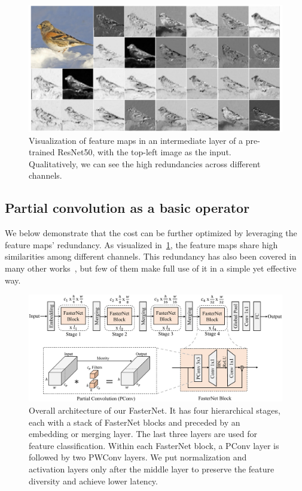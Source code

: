 \begin{figure}
    \centering
    \includegraphics[width=1\linewidth]{figures/feature_layer_2.pdf}
    \vspace{-0.25in}
    \caption{Visualization of feature maps in an intermediate layer of a pre-trained ResNet50, with the top-left image as the input. Qualitatively, we can see the high redundancies across different channels. }
    \label{fig: feature_redundancy}
    \vspace{-0.05in}
\end{figure}

\subsection{Partial convolution as a basic operator}
We below demonstrate that the cost can be further optimized by leveraging the feature maps' redundancy. As visualized in~\cref{fig: feature_redundancy}, the feature maps share high similarities among different channels. This redundancy has also been covered in many other works~\cite{han2020ghostnet,zhang2020split}, but few of them make full use of it in a simple yet effective way.

\begin{figure}
    \vspace{-0.05in}
    \centering
    \includegraphics[width=0.83\linewidth]{figures/FasterNet-cropped.pdf}
    \vspace{-0.1in}
    \caption{Overall architecture of our FasterNet. It has four hierarchical stages, each with a stack of FasterNet blocks and preceded by an embedding or merging layer. The last three layers are used for feature classification. Within each FasterNet block, a PConv layer is followed by two PWConv layers. We put normalization and activation layers only after the middle layer to preserve the feature diversity and achieve lower latency.
    }
    \label{fig: FasterNet}
    \vspace{-0.15in}
\end{figure}

